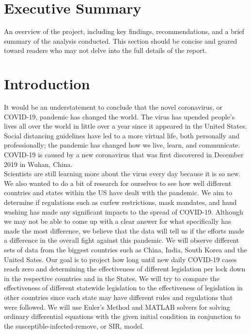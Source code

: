 \documentclass[a4paper,10pt]{article}
\begin{document}

\section{Executive Summary}

An overview of the project, including key findings, recommendations, and a brief summary of the analysis conducted. This section should be concise and geared toward readers who may not delve into the full details of the report. 

\section{Introduction}
It would be an understatement to conclude that the novel coronavirus, or COVID-19, pandemic has changed the world. The virus has upended people's lives all over the world in little over a year since it appeared in the United States. Social distancing guidelines have led to a more virtual life, both personally and professionally; the pandemic has changed how we live, learn, and communicate. COVID-19 is caused by a new coronavirus that was first discovered in December 2019 in Wuhan, China\textsuperscript{\cite{COV-19 1}}.\\
\indent Scientists are still learning more about the virus every day because it is so new. We also wanted to do a bit of research for ourselves to see how well different countries and states within the US have dealt with the pandemic. We aim to determine if regulations such as curfew restrictions, mask mandates, and hand washing has made any significant impacts to the spread of COVID-19. Although we may not be able to come up with a clear answer for what specifically has made the most difference, we believe that the data will tell us if the efforts made a difference in the overall fight against this pandemic. We will observe different sets of data from the biggest countries such as China, India, South Korea and the United Sates. Our goal is to project how long until new daily COVID-19 cases reach zero and determining the effectiveness of different legislation per lock down in the respective countries and in the States. We will try to compare the effectiveness of different statewide legislation to the effectiveness of legislation in other countries since each state may have different rules and regulations that were followed. We will use Euler's Method and MATLAB\textsuperscript{\textregistered} solvers for solving ordinary differential equations with the given initial condition in conjunction to the susceptible-infected-remove, or SIR, model. 
\end{document}

